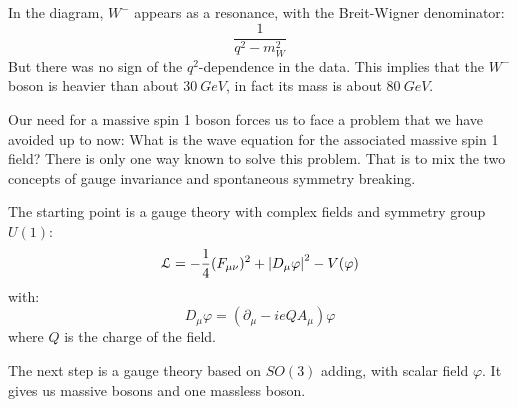 \documentclass[../../main/main.tex]{subfiles}
\begin{document}

In the diagram, \( W^- \) appears as a resonance, with the Breit-Wigner denominator:
\begin{equation}
	\frac{1}{q^2 - m^2_W}
	\label{eq:}
\end{equation}
But there was no sign of the \( q^2 \)-dependence in the data. This implies that the \( W^- \) boson is heavier than about \( 30 \ \si{GeV} \), in fact its mass is about \( 80 \ \si{GeV} \).

Our need for a massive spin 1 boson forces us to face a problem that we have avoided up to now: What is the wave equation for the associated massive spin 1 field? There is only one way known to solve this problem. That is to mix the two concepts of gauge invariance and spontaneous symmetry breaking.

The starting point is a gauge theory with complex fields and symmetry group \( U(1) \):
\begin{equation}
	\mathcal{L}
	=
	-\frac{1}{4} (F_{\mu\nu})^2 + \abs{D_{\mu}\varphi}^2 - V(\varphi)
	\label{eq:}
\end{equation}
with:
\begin{equation}
	D_{\mu}\varphi
	=
	(\partial_{\mu} - ieQA_{\mu}) \varphi
	\label{eq:}
\end{equation}
where \( Q \) is the charge of the field.

The next step is a gauge theory based on \( SO(3) \) adding, with scalar field \( \varphi \). It gives us massive bosons and one massless boson.
\end{document}
